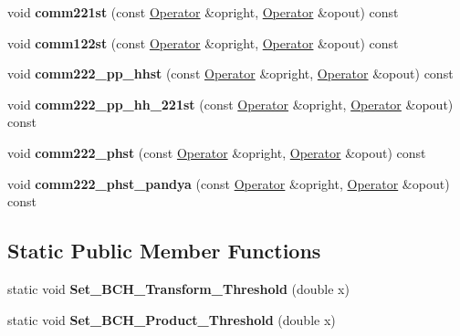 \begin{DoxyCompactItemize}
\item 
\hypertarget{classOperator_af90f2d16ebea510ae97ae4bbf6363113}{void {\bfseries comm221st} (const \hyperlink{classOperator}{Operator} \&opright, \hyperlink{classOperator}{Operator} \&opout) const }\label{classOperator_af90f2d16ebea510ae97ae4bbf6363113}

\item 
\hypertarget{classOperator_a375a7289a8d39cb7354380a1714dee32}{void {\bfseries comm122st} (const \hyperlink{classOperator}{Operator} \&opright, \hyperlink{classOperator}{Operator} \&opout) const }\label{classOperator_a375a7289a8d39cb7354380a1714dee32}

\item 
\hypertarget{classOperator_aa49d442b8dc21367a8973bc9814f4c96}{void {\bfseries comm222\-\_\-pp\-\_\-hhst} (const \hyperlink{classOperator}{Operator} \&opright, \hyperlink{classOperator}{Operator} \&opout) const }\label{classOperator_aa49d442b8dc21367a8973bc9814f4c96}

\item 
\hypertarget{classOperator_a780b931a73017ffbc1a70e7c86ca8256}{void {\bfseries comm222\-\_\-pp\-\_\-hh\-\_\-221st} (const \hyperlink{classOperator}{Operator} \&opright, \hyperlink{classOperator}{Operator} \&opout) const }\label{classOperator_a780b931a73017ffbc1a70e7c86ca8256}

\item 
\hypertarget{classOperator_a3d6754f76f04eaddc92dbbc7bbf21caa}{void {\bfseries comm222\-\_\-phst} (const \hyperlink{classOperator}{Operator} \&opright, \hyperlink{classOperator}{Operator} \&opout) const }\label{classOperator_a3d6754f76f04eaddc92dbbc7bbf21caa}

\item 
\hypertarget{classOperator_a86add7287c36700de1079e1f442b1e90}{void {\bfseries comm222\-\_\-phst\-\_\-pandya} (const \hyperlink{classOperator}{Operator} \&opright, \hyperlink{classOperator}{Operator} \&opout) const }\label{classOperator_a86add7287c36700de1079e1f442b1e90}

\end{DoxyCompactItemize}
\subsection*{Static Public Member Functions}
\begin{DoxyCompactItemize}
\item 
\hypertarget{classOperator_a6f505221635444cb0b489b9ac600fd61}{static void {\bfseries Set\-\_\-\-B\-C\-H\-\_\-\-Transform\-\_\-\-Threshold} (double x)}\label{classOperator_a6f505221635444cb0b489b9ac600fd61}

\item 
\hypertarget{classOperator_a2c42843a1a557f2ab568d106e8fd23e8}{static void {\bfseries Set\-\_\-\-B\-C\-H\-\_\-\-Product\-\_\-\-Threshold} (double x)}\label{classOperator_a2c42843a1a557f2ab568d106e8fd23e8}

\end{DoxyCompactItemize}

